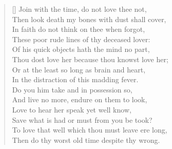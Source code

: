 \renewcommand{\poemtoc}{subsection}
\settowidth{\versewidth}{Thy proud hearts slave and vassal wretch to be?}
\begin{verse}[\versewidth]
Join with the time, do not love thee not,\\
Then look death my bones with dust shall cover,\\
In faith do not think on thee when forgot,\\
These poor rude lines of thy deceased lover:\\
\vspace{5pt}
Of his quick objects hath the mind no part,\\
Thou dost love her because thou knowst love her;\\
Or at the least so long as brain and heart,\\
In the distraction of this madding fever.\\
 \vspace{5pt}
Do you him take and in possession so,\\
And live no more, endure on them to look,\\
Love to hear her speak yet well know,\\
Save what is had or must from you be took?\\
 \vspace{5pt}
 \vin To love that well which thou must leave ere long,\\
 \vin Then do thy worst old time despite thy wrong.\\
 
\end{verse}
